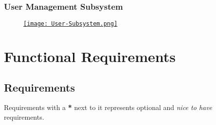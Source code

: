 \documentclass[11pt,a4paper]{article}
\begin{document}
\pagebreak
{}
\subsubsection*{User Management Subsystem}
\begin{figure}[htbp]
    \centering
    \href{https://drive.google.com/drive/u/2/folders/1rnYMSGTOmKY8_pOyJUIacjTxuubO_6NX}{\texttt{[image:  User-Subsystem.png]}}
\end{figure}

\pagebreak

\section*{Functional Requirements}

\subsection*{Requirements}

Requirements with a \textbf{*} next to it represents optional and \textit{nice
to have} requirements.
\end{document}
